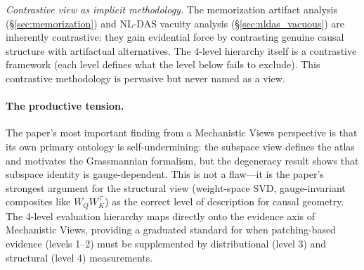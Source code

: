 \emph{Contrastive view as implicit methodology.} The memorization artifact
analysis (\S\ref{sec:memorization}) and NL-DAS vacuity analysis
(\S\ref{sec:nldas_vacuous}) are inherently contrastive: they gain evidential
force by contrasting genuine causal structure with artifactual alternatives.
The 4-level hierarchy itself is a contrastive framework (each level defines
what the level below fails to exclude). This contrastive methodology is
pervasive but never named as a view.

\paragraph{The productive tension.}
The paper's most important finding from a Mechanistic Views perspective is that its
own primary ontology is self-undermining: the subspace view defines the atlas
and motivates the Grassmannian formalism, but the degeneracy result shows that
subspace identity is gauge-dependent. This is not a flaw---it is the paper's
strongest argument for the structural view (weight-space SVD, gauge-invariant
composites like $W_Q W_K^\top$) as the correct level of description for
causal geometry. The 4-level evaluation hierarchy maps directly onto the
evidence axis of Mechanistic Views, providing a graduated standard for when
patching-based evidence (levels 1--2) must be supplemented by distributional
(level 3) and structural (level 4) measurements.


